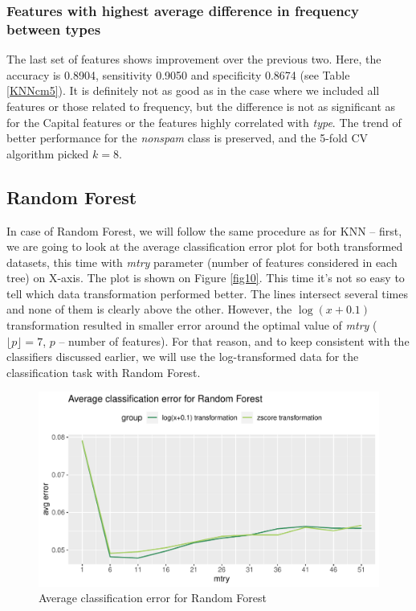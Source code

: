 \documentclass{article}\usepackage[]{graphicx}\usepackage[]{xcolor}
\makeatletter
\def\maxwidth{ %
  \ifdim\Gin@nat@width>\linewidth
    \linewidth
  \else
    \Gin@nat@width
  \fi
}
\newenvironment{knitrout}{}{} %
\makeatother
\begin{document}
\subsubsection*{Features with highest average difference in frequency between types}

The last set of features shows improvement over the previous two. Here, the accuracy is 0.8904,
sensitivity 0.9050 and specificity 0.8674 (see Table \ref{KNNcm5}). It is definitely not as good as in the case 
where we included all features or those related to frequency, but the difference is
not as significant as for the Capital features or the features highly correlated with \textit{type}.
The trend of better performance for the \textit{nonspam} class is preserved, and the 5-fold CV algorithm picked $k=8$.


\subsection*{Random Forest}

In case of Random Forest, we will follow the same procedure as for KNN -- first, 
we are going to look at the average classification error plot for both transformed
datasets, this time with \textit{mtry} parameter (number of features considered in each tree) on X-axis. 
The plot is shown on Figure \ref{fig10}. This time it's not so easy to tell which data transformation
performed better. The lines intersect several times and none of them is clearly above the other.
However, the $\log(x+0.1)$ transformation resulted in smaller error around the
optimal value of \textit{mtry} ($\lfloor p \rfloor = 7$, $p$ -- number of features).
For that reason, and to keep consistent with the classifiers discussed earlier, 
we will use the log-transformed data for the classification task with Random Forest.

\begin{knitrout}
\color{fgcolor}\begin{figure}[h]
\includegraphics[width=\maxwidth]{figure/avgErrRF-1} \caption[\label{fig10} Average classification error for Random Forest]{\label{fig10} Average classification error for Random Forest}\label{fig:avgErrRF}
\end{figure}

\end{knitrout}
\end{document}
